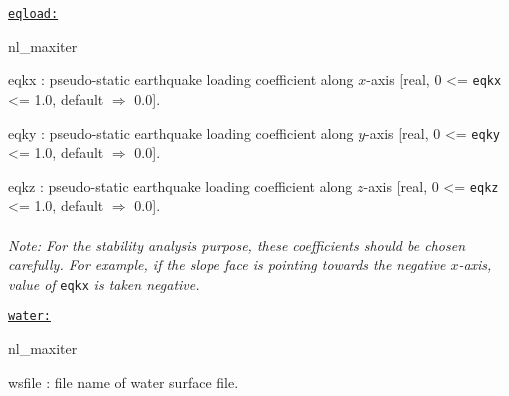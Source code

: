 \texttt{\underline{eqload:}}
\begin{adescription}{nl\_maxiter}
  \item[eqkx]: pseudo-static earthquake loading coefficient along $x$-axis [real, 0 <= \texttt{eqkx} <= 1.0, default $\Rightarrow$ 0.0].
  \item[eqky]: pseudo-static earthquake loading coefficient along $y$-axis [real, 0 <= \texttt{eqky} <= 1.0, default $\Rightarrow$ 0.0].
  \item[eqkz]: pseudo-static earthquake loading coefficient along $z$-axis [real, 0 <= \texttt{eqkz} <= 1.0, default $\Rightarrow$ 0.0].
  \\\\
  {\emph{Note: For the stability analysis purpose, these coefficients should be chosen carefully. For example, if the slope face is pointing towards the negative $x$-axis, value of}} \texttt{eqkx} {\emph{is taken negative.}} \\
\end{adescription}

\texttt{\underline{water:}}
\begin{adescription}{nl\_maxiter}
  \item[wsfile]: file name of water surface file.
  \\
\end{adescription}

